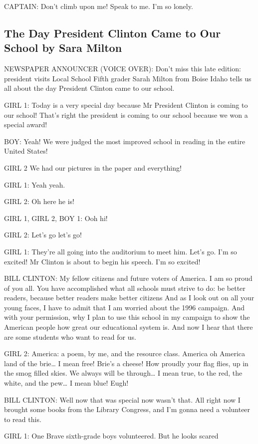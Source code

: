 CAPTAIN:
Don't climb upon me!
Speak to me.
I'm so lonely.

\subsection{The Day President Clinton Came to Our School by Sara Milton}

NEWSPAPER ANNOUNCER (VOICE OVER):
Don't miss this late edition: president visits Local School
Fifth grader Sarah Milton from Boise Idaho tells us all about the day President Clinton came to our school.

GIRL 1:
Today is a very special day because Mr President Clinton is coming to our school!
That's right the president is coming to our school because we won a special award!

BOY:
Yeah!
We were judged the most improved school in reading in the entire United States!

GIRL 2
We had our pictures in the paper and everything!

GIRL 1:
Yeah yeah.

GIRL 2:
Oh here he is!

GIRL 1, GIRL 2, BOY 1:
Ooh hi!

GIRL 2:
Let's go let's go!

GIRL 1:
They're all going into the auditorium to meet him.
Let's go.
I'm so excited!
Mr Clinton is about to begin his speech.
I'm so excited!

BILL CLINTON:
My fellow citizens and future voters of America.
I am so proud of you all.
You have accomplished what all schools must strive to do: be better readers, because better readers make better citizens
And as I look out on all your young faces, I have to admit that I am worried about the 1996 campaign.
And with your permission, why I plan to use this school in my campaign to show the American people how great our educational system is.
And now I hear that there are some students who want to read for us.

GIRL 2:
America: a poem, by me, and the resource class.
America oh America land of the brie\dots
I mean free!
Brie's a cheese!
How proudly your flag flies, up in the smog filled skies.
We always will be through\dots
I mean true, to the red, the white, and the pew\dots
I mean blue!
Eugh!

BILL CLINTON:
Well now that was special now wasn't that.
All right now I brought some books from the Library Congress, and I'm gonna need a volunteer to read this.

GIRL 1:
One Brave sixth-grade boys volunteered.
But he looks scared

